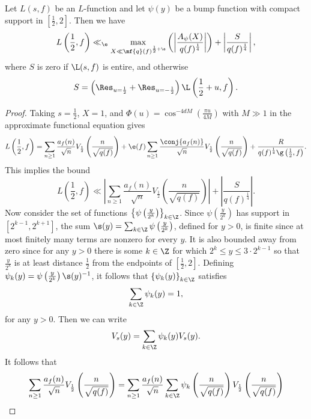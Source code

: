     \begin{theorem}
      Let $L(s,f)$ be an $L$-function and let $\psi(y)$ be a bump function with compact support in $\left[\frac{1}{2},2\right]$. Then we have
      \[
        L\left(\frac{1}{2},f\right) \ll_{\e} \max_{X \ll \mf{q}(f)^{\frac{1}{2}+\e}}\left(\left|\frac{A_{\psi}(X)}{q(f)^{\frac{1}{4}}}\right|\right)+\left|\frac{S}{q(f)^{\frac{1}{4}}}\right|,
      \]
      where $S$ is zero if $\L(s,f)$ is entire, and otherwise
      \[
        S = \left(\Res_{u = \frac{1}{2}}+\Res_{u = -\frac{1}{2}}\right)\L\left(\frac{1}{2}+u,f\right).
      \]
    \end{theorem}
    \begin{proof}
      Taking $s = \frac{1}{2}$, $X = 1$, and $\Phi(u) = \cos^{-4dM}\left(\frac{\pi u}{4M}\right)$ with $M \gg 1$ in the approximate functional equation gives
      \[
        L\left(\frac{1}{2},f\right) = \sum_{n \ge 1}\frac{a_{f}(n)}{\sqrt{n}}V_{\frac{1}{2}}\left(\frac{n}{\sqrt{q(f)}}\right)+\e(f)\sum_{n \ge 1}\frac{\conj{a_{f}(n)}}{\sqrt{n}}V_{\frac{1}{2}}\left(\frac{n}{\sqrt{q(f)}}\right)+\frac{R}{q(f)^{\frac{1}{4}}\g\left(\frac{1}{2},f\right)}.
      \]
      This implies the bound
      \[
        L\left(\frac{1}{2},f\right) \ll \left|\sum_{n \ge 1}\frac{a_{f}(n)}{\sqrt{n}}V_{\frac{1}{2}}\left(\frac{n}{\sqrt{q(f)}}\right)\right|+\left|\frac{S}{q(f)^{\frac{1}{4}}}\right|.
      \]
      Now consider the set of functions $\left\{\psi\left(\frac{y}{2^{k}}\right)\right\}_{k \in \Z}$. Since $\psi\left(\frac{y}{2^{k}}\right)$ has support in $[2^{k-1},2^{k+1}]$, the sum $\s(y) = \sum_{k \in \Z}\psi\left(\frac{y}{2^{k}}\right)$, defined for $y > 0$, is finite since at most finitely many terms are nonzero for every $y$. It is also bounded away from zero since for any $y > 0$ there is some $k \in \Z$ for which $2^{k} \le y \le 3 \cdot 2^{k-1}$ so that $\frac{y}{2^{k}}$ is at least distance $\frac{1}{2}$ from the endpoints of $\left[\frac{1}{2},2\right]$. Defining $\psi_{k}(y) = \psi\left(\frac{y}{2^{k}}\right)\s(y)^{-1}$, it follows that $\left\{\psi_{k}(y)\right\}_{k \in \Z}$ satisfies
      \[
        \sum_{k \in \Z}\psi_{k}(y) = 1,
      \]
      for any $y > 0$. Then we can write
      \[
        V_{s}(y) = \sum_{k \in \Z}\psi_{k}(y)V_{s}(y).
      \]
      It follows that
      \begin{align*}
        \sum_{n \ge 1}\frac{a_{f}(n)}{\sqrt{n}}V_{\frac{1}{2}}\left(\frac{n}{\sqrt{q(f)}}\right) &= \sum_{n \ge 1}\frac{a_{f}(n)}{\sqrt{n}}\sum_{k \in \Z}\psi_{k}\left(\frac{n}{\sqrt{q(f)}}\right)V_{\frac{1}{2}}\left(\frac{n}{\sqrt{q(f)}}\right) \\

\end{align*}
\end{proof}
